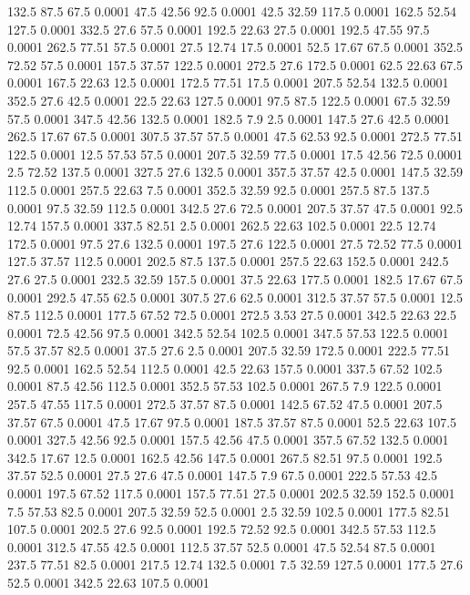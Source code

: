 132.5	87.5	67.5	0.0001
47.5	42.56	92.5	0.0001
42.5	32.59	117.5	0.0001
162.5	52.54	127.5	0.0001
332.5	27.6	57.5	0.0001
192.5	22.63	27.5	0.0001
192.5	47.55	97.5	0.0001
262.5	77.51	57.5	0.0001
27.5	12.74	17.5	0.0001
52.5	17.67	67.5	0.0001
352.5	72.52	57.5	0.0001
157.5	37.57	122.5	0.0001
272.5	27.6	172.5	0.0001
62.5	22.63	67.5	0.0001
167.5	22.63	12.5	0.0001
172.5	77.51	17.5	0.0001
207.5	52.54	132.5	0.0001
352.5	27.6	42.5	0.0001
22.5	22.63	127.5	0.0001
97.5	87.5	122.5	0.0001
67.5	32.59	57.5	0.0001
347.5	42.56	132.5	0.0001
182.5	7.9	2.5	0.0001
147.5	27.6	42.5	0.0001
262.5	17.67	67.5	0.0001
307.5	37.57	57.5	0.0001
47.5	62.53	92.5	0.0001
272.5	77.51	122.5	0.0001
12.5	57.53	57.5	0.0001
207.5	32.59	77.5	0.0001
17.5	42.56	72.5	0.0001
2.5	72.52	137.5	0.0001
327.5	27.6	132.5	0.0001
357.5	37.57	42.5	0.0001
147.5	32.59	112.5	0.0001
257.5	22.63	7.5	0.0001
352.5	32.59	92.5	0.0001
257.5	87.5	137.5	0.0001
97.5	32.59	112.5	0.0001
342.5	27.6	72.5	0.0001
207.5	37.57	47.5	0.0001
92.5	12.74	157.5	0.0001
337.5	82.51	2.5	0.0001
262.5	22.63	102.5	0.0001
22.5	12.74	172.5	0.0001
97.5	27.6	132.5	0.0001
197.5	27.6	122.5	0.0001
27.5	72.52	77.5	0.0001
127.5	37.57	112.5	0.0001
202.5	87.5	137.5	0.0001
257.5	22.63	152.5	0.0001
242.5	27.6	27.5	0.0001
232.5	32.59	157.5	0.0001
37.5	22.63	177.5	0.0001
182.5	17.67	67.5	0.0001
292.5	47.55	62.5	0.0001
307.5	27.6	62.5	0.0001
312.5	37.57	57.5	0.0001
12.5	87.5	112.5	0.0001
177.5	67.52	72.5	0.0001
272.5	3.53	27.5	0.0001
342.5	22.63	22.5	0.0001
72.5	42.56	97.5	0.0001
342.5	52.54	102.5	0.0001
347.5	57.53	122.5	0.0001
57.5	37.57	82.5	0.0001
37.5	27.6	2.5	0.0001
207.5	32.59	172.5	0.0001
222.5	77.51	92.5	0.0001
162.5	52.54	112.5	0.0001
42.5	22.63	157.5	0.0001
337.5	67.52	102.5	0.0001
87.5	42.56	112.5	0.0001
352.5	57.53	102.5	0.0001
267.5	7.9	122.5	0.0001
257.5	47.55	117.5	0.0001
272.5	37.57	87.5	0.0001
142.5	67.52	47.5	0.0001
207.5	37.57	67.5	0.0001
47.5	17.67	97.5	0.0001
187.5	37.57	87.5	0.0001
52.5	22.63	107.5	0.0001
327.5	42.56	92.5	0.0001
157.5	42.56	47.5	0.0001
357.5	67.52	132.5	0.0001
342.5	17.67	12.5	0.0001
162.5	42.56	147.5	0.0001
267.5	82.51	97.5	0.0001
192.5	37.57	52.5	0.0001
27.5	27.6	47.5	0.0001
147.5	7.9	67.5	0.0001
222.5	57.53	42.5	0.0001
197.5	67.52	117.5	0.0001
157.5	77.51	27.5	0.0001
202.5	32.59	152.5	0.0001
7.5	57.53	82.5	0.0001
207.5	32.59	52.5	0.0001
2.5	32.59	102.5	0.0001
177.5	82.51	107.5	0.0001
202.5	27.6	92.5	0.0001
192.5	72.52	92.5	0.0001
342.5	57.53	112.5	0.0001
312.5	47.55	42.5	0.0001
112.5	37.57	52.5	0.0001
47.5	52.54	87.5	0.0001
237.5	77.51	82.5	0.0001
217.5	12.74	132.5	0.0001
7.5	32.59	127.5	0.0001
177.5	27.6	52.5	0.0001
342.5	22.63	107.5	0.0001
